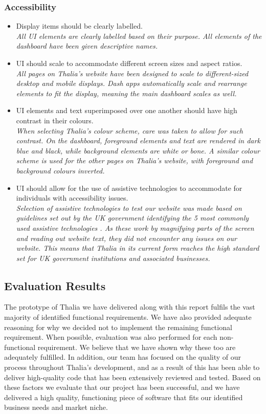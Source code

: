 \documentclass[main.tex]{subfiles}
\begin{document}
\subsubsection{Accessibility}
\begin{itemize}

\item Display items should be clearly labelled.\\
\textit{All UI elements are clearly labelled based on their purpose. All elements of the dashboard have been given descriptive names.}
\item UI should scale to accommodate diﬀerent screen sizes and aspect ratios.\\
\textit{All pages on Thalia's website have been designed to scale to different-sized desktop and mobile displays. Dash apps automatically scale and rearrange elements to fit the display, meaning the main dashboard scales as well.}
\item UI elements and text superimposed over one another should have high contrast in their colours.\\
\textit{When selecting Thalia’s colour scheme, care was taken to allow for such contrast. On the dashboard, foreground elements and text are rendered in dark blue and black, while background elements are white or bone. A similar colour scheme is used for the other pages on Thalia’s website, with foreground and background colours inverted.}

\item UI should allow for the use of assistive technologies to accommodate for individuals with accessibility issues.\\
\textit{Selection of assistive technologies to test our website was made based on guidelines set out by the UK government identifying the 5 most commonly used assistive technologies \cite{govUKAccessability}. As these work by magnifying parts of the screen and reading out website text, they did not encounter any issues on our website. This means that Thalia in its current form reaches the high standard set for UK government institutions and associated businesses.}

\end{itemize}

\subsection{Evaluation Results}
The prototype of Thalia we have delivered along with this report fulfils the vast majority of identified functional requirements. We have also provided adequate reasoning for why we decided not to implement the remaining functional requirement. When possible, evaluation was also performed for each non-functional requirement. We believe that we have shown why these too are adequately fulfilled. In addition, our team has focused on the quality of our process throughout Thalia’s development, and as a result of this has been able to deliver high-quality code that has been extensively reviewed and tested. Based on these factors we evaluate that our project has been successful, and we have delivered a high quality, functioning piece of software that fits our identified business needs and market niche. 
\end{document}
